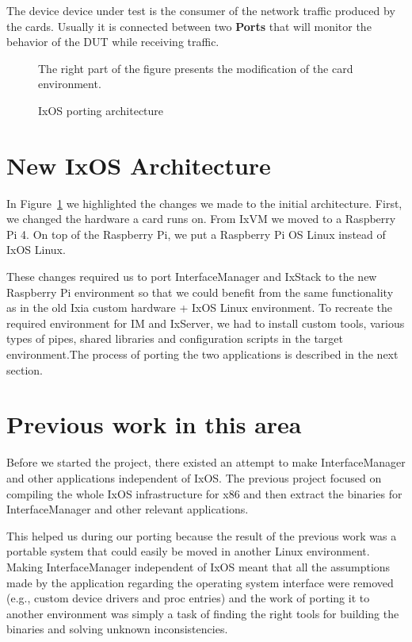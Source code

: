 The device device under test is the consumer of the network traffic produced by
the cards. Usually it is connected between two \textbf{Ports} that will monitor the
behavior of the DUT while receiving traffic.

\begin{figure}
    \centering
    \def\svgscale{0.95}
    
    \caption{IxOS porting architecture}
    \label{fig:ixos_arch}
    \medskip
    \small
    The right part of the figure presents the modification of the card
    environment.
\end{figure}

\section{New IxOS Architecture}

In Figure~\ref{fig:ixos_arch} we highlighted the changes we made to the initial
architecture. First, we changed the hardware a card runs on. From IxVM we moved
to a Raspberry Pi 4. On top of the Raspberry Pi, we put a Raspberry Pi OS Linux
instead of IxOS Linux.

These changes required us to port InterfaceManager and IxStack to the new
Raspberry Pi environment so that we could benefit from the same functionality as
in the old Ixia custom hardware + IxOS Linux environment. To recreate the
required environment for IM and IxServer, we had to install custom tools,
various types of pipes, shared libraries and configuration scripts in the target
environment.The process of porting the two applications is described in the next
section.

\section{Previous work in this area}

Before we started the project, there existed an attempt to make InterfaceManager
and other applications independent of IxOS. The previous project focused on
compiling the whole IxOS infrastructure for x86 and then extract the binaries
for InterfaceManager and other relevant applications.

This helped us during our porting because the result of the previous work was a
portable system that could easily be moved in another Linux environment.
Making InterfaceManager independent of IxOS meant that all the assumptions made
by the application regarding the operating system interface were removed (e.g.,
custom device drivers and proc entries) and the work of porting it to another
environment was simply a task of finding the right tools for building the
binaries and solving unknown inconsistencies.

